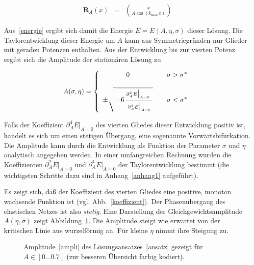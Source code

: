 \begin{eqnarray}
    \mathbf{R}_A(x)&=&{\binom{x}{A\cos(k_{\text{max}}\,x)}}
    \label{ansatz}
\end{eqnarray}

Aus~\eqref{energie} ergibt sich damit die Energie $E=E(A,\eta,\sigma)$
dieser Lösung. Die Taylorentwicklung dieser Energie um $A$ kann aus
Symmetriegründen nur Glieder mit geraden Potenzen enthalten. Aus der
Entwicklung bis zur vierten Potenz ergibt sich die Amplitude der
stationären Lösung zu

\begin{equation}
    A(\sigma,\eta)=\left\{\begin{array}{cll}
                              0&&\sigma>\sigma^\ast\\
                              &&\\
                              \pm\sqrt{-6\,\frac{{\vrule width 0pt height 0.30cm}\partial_A^2E\big\vert_{A=0_{\phantom{g}}}}{{\vrule width 0pt height 0.4cm}\partial_A^4E\big\vert_{A=0}}}&&\sigma<\sigma^\ast
    \end{array}\right.
    \label{ampli}
\end{equation}

Falls der Koeffizient $\partial_A^4E\big\vert_{A=0}$ des vierten Gliedes
dieser Entwicklung positiv ist, handelt es sich um einen stetigen
Übergang, eine sogenannte Vorwärtsbifurkation. Die Amplitude kann durch die
Entwicklung als Funktion der Parameter $\sigma$ und $\eta$ analytisch
angegeben werden. In einer umfangreichen Rechnung wurden die Koeffizienten
$\partial_A^2E\big\vert_{A=0}$ und $\partial_A^4E\big\vert_{A=0}$ der
Taylorentwicklung bestimmt (die wichtigsten Schritte dazu sind in
Anhang~\ref{anhang1} aufgeführt).

Es zeigt sich, daß der Koeffizient des vierten Gliedes eine positive,
monoton wachsende Funktion ist (vgl. Abb.~\ref{koeffizient}). Der
Phasenübergang des elastischen Netzes ist also \emph{stetig}. Eine
Darstellung der Gleichgewichtsamplitude $A(\eta,\sigma)$ zeigt
Abbildung~\ref{surface}. Die Amplitude steigt wie erwartet von der
kritischen Linie aus wurzelförmig an. Für kleine $\eta$ nimmt ihre
Steigung zu.

\begin{figure}[t]
    \centering
    \caption{Amplitude~\eqref{ampli} des Lösungsansatzes~\eqref{ansatz} gezeigt
    für  $A\in[0\ldots0.7]$ (zur besseren Übersicht farbig kodiert).}
    \label{surface}
\end{figure}

